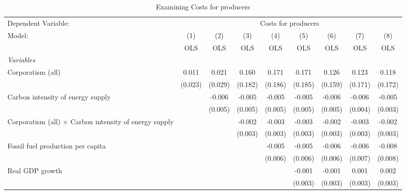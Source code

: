 
\begin{table}[htbp]
   \caption{Examining Costs for producers}
   \centering
   \begin{tabular}{lcccccccc}
      \toprule
      Dependent Variable: & \multicolumn{8}{c}{Costs for producers}\\
      Model:                                                        & (1)     & (2)     & (3)     & (4)     & (5)     & (6)     & (7)     & (8)\\  
                                                                    &  OLS    & OLS     & OLS     & OLS     & OLS     & OLS     & OLS     & OLS\\  
      \midrule
      \emph{Variables}\\
      Corporatism (all)                                             & 0.011   & 0.021   & 0.160   & 0.171   & 0.171   & 0.126   & 0.123   & 0.118\\   
                                                                    & (0.023) & (0.029) & (0.182) & (0.186) & (0.185) & (0.159) & (0.171) & (0.172)\\   
      Carbon intensity of energy supply                             &         & -0.006  & -0.005  & -0.005  & -0.005  & -0.006  & -0.006  & -0.005\\   
                                                                    &         & (0.005) & (0.005) & (0.005) & (0.005) & (0.005) & (0.004) & (0.003)\\   
      Corporatism (all) $\times$ Carbon intensity of energy supply  &         &         & -0.002  & -0.003  & -0.003  & -0.002  & -0.003  & -0.002\\   
                                                                    &         &         & (0.003) & (0.003) & (0.003) & (0.003) & (0.003) & (0.003)\\   
      Fossil fuel production per capita                             &         &         &         & -0.005  & -0.005  & -0.006  & -0.006  & -0.008\\   
                                                                    &         &         &         & (0.006) & (0.006) & (0.006) & (0.007) & (0.008)\\   
      Real GDP growth                                               &         &         &         &         & -0.001  & -0.001  & 0.001   & 0.002\\   
                                                                    &         &         &         &         & (0.003) & (0.003) & (0.003) & (0.003)\\   

\end{tabular}
\end{table}
